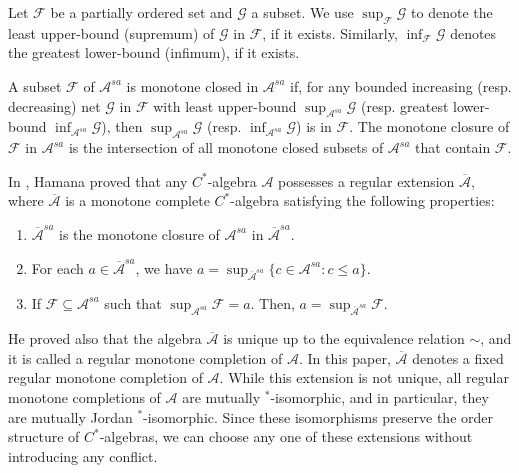 \documentclass[12pt]{amsart}
\theoremstyle{definition}
\theoremstyle{remark}
\numberwithin{equation}{section}
\begin{document}
Let $\mathcal{F}$ be a partially ordered set and $\mathcal{G}$ a subset. We use $\sup_{\mathcal{F}}  \mathcal{G}$ to denote the least upper-bound (supremum) of $\mathcal{G}$ in  $\mathcal{F}$, if it exists. Similarly, $\inf_{\mathcal{F}} \mathcal{G}$ denotes the greatest lower-bound (infimum), if it exists.

A subset $\mathcal{F}$ of $\mathcal{A}^{sa}$ is monotone closed in $\mathcal{A}^{sa}$ if, for any bounded  increasing (resp. decreasing)  net $\mathcal{G}$ in $\mathcal{F}$ with  least upper-bound $\sup_{\mathcal{A}^{sa}}\mathcal{G}$ (resp. greatest
lower-bound  $\inf_{\mathcal{A}^{sa}}\mathcal{G}$),
then $\sup_{\mathcal{A}^{sa}}\mathcal{G}$ 
(resp. $\inf_{\mathcal{A}^{sa}}\mathcal{G}$) is in $\mathcal{F}$. The monotone closure of $\mathcal{F}$ in $\mathcal{A}^{sa}$ is the intersection of all monotone closed subsets of $\mathcal{A}^{sa}$ that contain $\mathcal{F}$.






In \cite[Theorem 3.1]{Hamana}, Hamana proved that any $C^{*}$-algebra $\mathcal{A}$ possesses  a 
regular extension  $\overline{\mathcal{A}}$, where $\overline{\mathcal{A}}$ is a monotone complete $C^*$-algebra satisfying  the following properties:



\begin{enumerate}
	\item[(i)]  $ \overline{\mathcal{A}}^{sa}$  is the  monotone closure of $\mathcal{A}^{sa}$  in $ \overline{\mathcal{A}}^{sa}$. \\
	
	\item[(ii)] For each $a\in  \overline{\mathcal{A}}^{sa}$, we have   $a=\sup_{\overline{\mathcal{A}}^{sa}}\{c\in \mathcal{A}^{sa}: c\leq a\}$. \\
	
	\item[(iii)] If  $\mathcal{F}\subseteq \mathcal{A}^{sa}$ such that $\sup_{\mathcal{A}^{sa}}\mathcal{F}=a$. Then, $a= \sup_{\overline{\mathcal{A}}^{sa}}\mathcal{F}$.
\end{enumerate} 
He proved also that the algebra $\overline{\mathcal{A}}$  is unique up to the equivalence relation $\sim$,  and it is called 
a regular monotone completion of $\mathcal{A}$. In this paper, $\overline{\mathcal{A}}$ denotes a fixed   regular monotone completion of $\mathcal{A}$. While this extension is not unique, all regular monotone completions  of  $\mathcal{A}$ are  mutually $^*$-isomorphic, and in particular, they are  mutually Jordan $^*$-isomorphic. Since these isomorphisms preserve the order structure of $C^*$-algebras, we can choose any one of these extensions without introducing any conflict.
\end{document}
